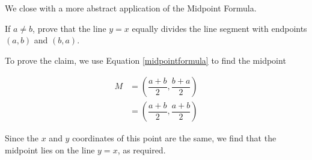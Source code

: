 \medskip


\label{inversemidpoint}

We close with a more abstract application of the Midpoint Formula.  

\medskip

{
If $a \neq b$, prove that the line $y = x$ equally divides the line segment with endpoints $(a,b)$ and $(b,a)$.
}
{
To prove the claim, we use Equation \ref{midpointformula} to find the midpoint  


\begin{align*}
 M & =  \left( \dfrac{a+b}{2},  \dfrac{b+a}{2} \right) \\
   & =  \left( \dfrac{a+b}{2},  \dfrac{a+b}{2} \right)
\end{align*}

Since the $x$ and $y$ coordinates of this point are the same, we find that the midpoint lies on the line $y=x$, as required. 
}

{}
